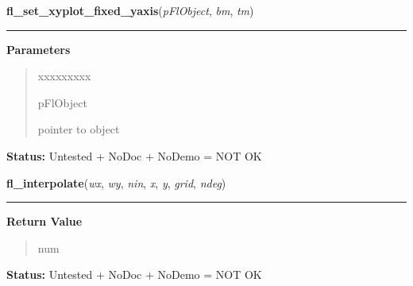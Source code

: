 \hspace{.8\funcindent}\begin{boxedminipage}{\funcwidth}

    \raggedright \textbf{fl\_set\_xyplot\_fixed\_yaxis}(\textit{pFlObject}, \textit{bm}, \textit{tm})

    \vspace{-1.5ex}

    \rule{\textwidth}{0.5\fboxrule}
\setlength{\parskip}{2ex}
\setlength{\parskip}{1ex}
      \textbf{Parameters}
      \vspace{-1ex}

      \begin{quote}
        \begin{Ventry}{xxxxxxxxx}

          \item[pFlObject]

          pointer to object

        \end{Ventry}

      \end{quote}

\textbf{Status:} Untested + NoDoc + NoDemo = NOT OK



    \end{boxedminipage}

    \label{xformslib:flxyplot:fl_interpolate}

    \vspace{0.5ex}

\hspace{.8\funcindent}\begin{boxedminipage}{\funcwidth}

    \raggedright \textbf{fl\_interpolate}(\textit{wx}, \textit{wy}, \textit{nin}, \textit{x}, \textit{y}, \textit{grid}, \textit{ndeg})

    \vspace{-1.5ex}

    \rule{\textwidth}{0.5\fboxrule}
\setlength{\parskip}{2ex}
\setlength{\parskip}{1ex}
      \textbf{Return Value}
    \vspace{-1ex}

      \begin{quote}
      num

      \end{quote}

\textbf{Status:} Untested + NoDoc + NoDemo = NOT OK



    \end{boxedminipage}


